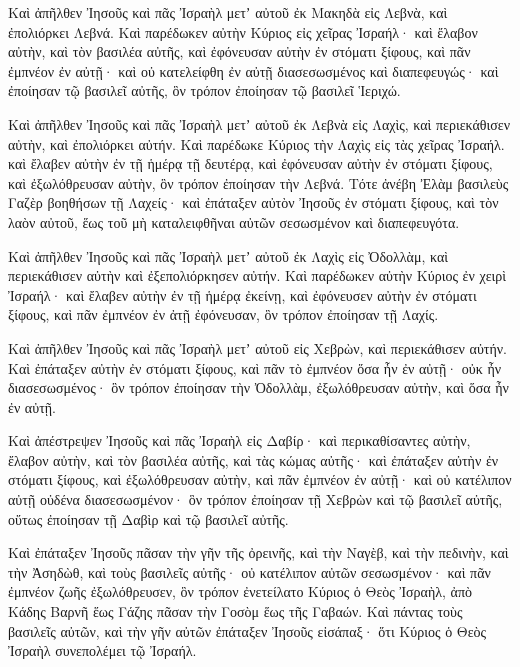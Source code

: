 {\par }{\PP {}Καὶ ἀπῆλθεν Ἰησοῦς καὶ πᾶς Ἰσραὴλ μετʼ αὐτοῦ ἐκ Μακηδὰ εἰς Λεβνὰ, καὶ ἐπολιόρκει Λεβνά.
Καὶ παρέδωκεν αὐτὴν Κύριος εἰς χεῖρας Ἰσραήλ· καὶ ἔλαβον αὐτὴν, καὶ τὸν βασιλέα αὐτῆς, καὶ ἐφόνευσαν αὐτὴν ἐν στόματι ξίφους, καὶ πᾶν ἐμπνέον ἐν αὐτῇ· καὶ οὐ κατελείφθη ἐν αὐτῇ διασεσωσμένος καὶ διαπεφευγώς· καὶ ἐποίησαν τῷ βασιλεῖ αὐτῆς, ὃν τρόπον ἐποίησαν τῷ βασιλεῖ Ἱεριχώ.
\par }{\PP {}Καὶ ἀπῆλθεν Ἰησοῦς καὶ πᾶς Ἰσραὴλ μετʼ αὐτοῦ ἐκ Λεβνὰ εἰς Λαχὶς, καὶ περιεκάθισεν αὐτὴν, καὶ ἐπολιόρκει αὐτήν.
Καὶ παρέδωκε Κύριος τὴν Λαχὶς εἰς τὰς χεῖρας Ἰσραήλ. καὶ ἔλαβεν αὐτὴν ἐν τῇ ἡμέρᾳ τῇ δευτέρᾳ, καὶ ἐφόνευσαν αὐτὴν ἐν στόματι ξίφους, καὶ ἐξωλόθρευσαν αὐτὴν, ὃν τρόπον ἐποίησαν τὴν Λεβνά.
Τότε ἀνέβη Ἐλὰμ βασιλεὺς Γαζὲρ βοηθήσων τῇ Λαχείς· καὶ ἐπάταξεν αὐτὸν Ἰησοῦς ἐν στόματι ξίφους, καὶ τὸν λαὸν αὐτοῦ, ἕως τοῦ μὴ καταλειφθῆναι αὐτῶν σεσωσμένον καὶ διαπεφευγότα.
\par }{\PP {}Καὶ ἀπῆλθεν Ἰησοῦς καὶ πᾶς Ἰσραὴλ μετʼ αὐτοῦ ἐκ Λαχὶς εἰς Ὀδολλὰμ, καὶ περιεκάθισεν αὐτὴν καὶ ἐξεπολιόρκησεν αὐτήν.
Καὶ παρέδωκεν αὐτὴν Κύριος ἐν χειρὶ Ἰσραήλ· καὶ ἔλαβεν αὐτὴν ἐν τῇ ἡμέρᾳ ἐκείνῃ, καὶ ἐφόνευσεν αὐτὴν ἐν στόματι ξίφους, καὶ πᾶν ἐμπνέον ἐν ἀτῇ ἐφόνευσαν, ὃν τρόπον ἐποίησαν τῇ Λαχίς.
\par }{\PP {}Καὶ ἀπῆλθεν Ἰησοῦς καὶ πᾶς Ἰσραὴλ μετʼ αὐτοῦ εἰς Χεβρὼν, καὶ περιεκάθισεν αὐτήν.
Καὶ ἐπάταξεν αὐτὴν ἐν στόματι ξίφους, καὶ πᾶν τὸ ἐμπνέον ὅσα ἦν ἐν αὐτῇ· οὐκ ἦν διασεσωσμένος· ὃν τρόπον ἐποίησαν τὴν Ὀδολλὰμ, ἐξωλόθρευσαν αὐτὴν, καὶ ὅσα ἦν ἐν αὐτῇ.
\par }{\PP {}Καὶ ἀπέστρεψεν Ἰησοῦς καὶ πᾶς Ἰσραὴλ εἰς Δαβίρ· καὶ περικαθίσαντες αὐτὴν,
ἔλαβον αὐτὴν, καὶ τὸν βασιλέα αὐτῆς, καὶ τὰς κώμας αὐτῆς· καὶ ἐπάταξεν αὐτὴν ἐν στόματι ξίφους, καὶ ἐξωλόθρευσαν αὐτὴν, καὶ πᾶν ἐμπνέον ἐν αὐτῇ· καὶ οὐ κατέλιπον αὐτῇ οὐδένα διασεσωσμένον· ὃν τρόπον ἐποίησαν τῇ Χεβρὼν καὶ τῷ βασιλεῖ αὐτῆς, οὕτως ἐποίησαν τῇ Δαβὶρ καὶ τῷ βασιλεῖ αὐτῆς.
\par }{\PP {}Καὶ ἐπάταξεν Ἰησοῦς πᾶσαν τὴν γῆν τῆς ὀρεινῆς, καὶ τὴν Ναγὲβ, καὶ τὴν πεδινὴν, καὶ τὴν Ἀσηδὼθ, καὶ τοὺς βασιλεῖς αὐτῆς· οὐ κατέλιπον αὐτῶν σεσωσμένον· καὶ πᾶν ἐμπνέον ζωῆς ἐξωλόθρευσεν, ὃν τρόπον ἐνετείλατο Κύριος ὁ Θεὸς Ἰσραὴλ,
ἀπὸ Κάδης Βαρνῆ ἕως Γάζης πᾶσαν τὴν Γοσὸμ ἕως τῆς Γαβαών.
Καὶ πάντας τοὺς βασιλεῖς αὐτῶν, καὶ τὴν γῆν αὐτῶν ἐπάταξεν Ἰησοῦς εἰσάπαξ· ὅτι Κύριος ὁ Θεὸς Ἰσραὴλ συνεπολέμει τῷ Ἰσραήλ.

}
